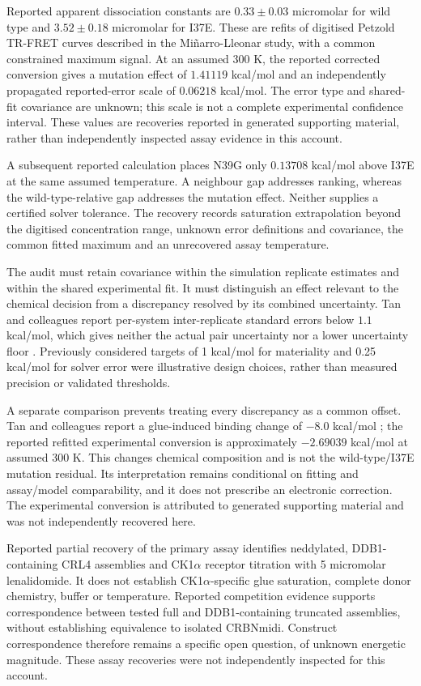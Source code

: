 \documentclass{article}
\begin{document}
Reported apparent dissociation constants are \(0.33\pm0.03\) micromolar for wild type and \(3.52\pm0.18\) micromolar for I37E. These are refits of digitised Petzold TR-FRET curves described in the Mi\~narro-Lleonar study, with a common constrained maximum signal. At an assumed 300 K, the reported corrected conversion gives a mutation effect of \(1.41119\) kcal/mol and an independently propagated reported-error scale of \(0.06218\) kcal/mol. The error type and shared-fit covariance are unknown; this scale is not a complete experimental confidence interval. These values are recoveries reported in generated supporting material, rather than independently inspected assay evidence in this account.

A subsequent reported calculation places N39G only \(0.13708\) kcal/mol above I37E at the same assumed temperature. A neighbour gap addresses ranking, whereas the wild-type-relative gap addresses the mutation effect. Neither supplies a certified solver tolerance. The recovery records saturation extrapolation beyond the digitised concentration range, unknown error definitions and covariance, the common fitted maximum and an unrecovered assay temperature.

The audit must retain covariance within the simulation replicate estimates and within the shared experimental fit. It must distinguish an effect relevant to the chemical decision from a discrepancy resolved by its combined uncertainty. Tan and colleagues report per-system inter-replicate standard errors below \(1.1\) kcal/mol, which gives neither the actual pair uncertainty nor a lower uncertainty floor \cite{Q}. Previously considered targets of 1 kcal/mol for materiality and 0.25 kcal/mol for solver error were illustrative design choices, rather than measured precision or validated thresholds.

A separate comparison prevents treating every discrepancy as a common offset. Tan and colleagues report a glue-induced binding change of \(-8.0\) kcal/mol \cite{Q}; the reported refitted experimental conversion is approximately \(-2.69039\) kcal/mol at assumed 300 K. This changes chemical composition and is not the wild-type/I37E mutation residual. Its interpretation remains conditional on fitting and assay/model comparability, and it does not prescribe an electronic correction. The experimental conversion is attributed to generated supporting material and was not independently recovered here.

Reported partial recovery of the primary assay identifies neddylated, DDB1-containing CRL4 assemblies and CK1\(\alpha\) receptor titration with 5 micromolar lenalidomide. It does not establish CK1\(\alpha\)-specific glue saturation, complete donor chemistry, buffer or temperature. Reported competition evidence supports correspondence between tested full and DDB1-containing truncated assemblies, without establishing equivalence to isolated CRBNmidi. Construct correspondence therefore remains a specific open question, of unknown energetic magnitude. These assay recoveries were not independently inspected for this account.
\end{document}
